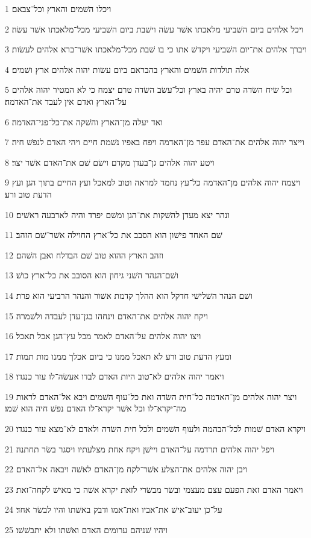 \par 1 ויכלו השׁמים והארץ וכל־צבאם׃
\par 2 ויכל אלהים ביום השׁביעי מלאכתו אשׁר עשׂה וישׁבת ביום השׁביעי מכל־מלאכתו אשׁר עשׂה׃
\par 3 ויברך אלהים את־יום השׁביעי ויקדשׁ אתו כי בו שׁבת מכל־מלאכתו אשׁר־ברא אלהים לעשׂות׃
\par 4 אלה תולדות השׁמים והארץ בהבראם ביום עשׂות יהוה אלהים ארץ ושׁמים׃
\par 5 וכל שׂיח השׂדה טרם יהיה בארץ וכל־עשׂב השׂדה טרם יצמח כי לא המטיר יהוה אלהים על־הארץ ואדם אין לעבד את־האדמה׃
\par 6 ואד יעלה מן־הארץ והשׁקה את־כל־פני־האדמה׃
\par 7 וייצר יהוה אלהים את־האדם עפר מן־האדמה ויפח באפיו נשׁמת חיים ויהי האדם לנפשׁ חיה׃
\par 8 ויטע יהוה אלהים גן־בעדן מקדם וישׂם שׁם את־האדם אשׁר יצר׃
\par 9 ויצמח יהוה אלהים מן־האדמה כל־עץ נחמד למראה וטוב למאכל ועץ החיים בתוך הגן ועץ הדעת טוב ורע׃
\par 10 ונהר יצא מעדן להשׁקות את־הגן ומשׁם יפרד והיה לארבעה ראשׁים׃
\par 11 שׁם האחד פישׁון הוא הסבב את כל־ארץ החוילה אשׁר־שׁם הזהב׃
\par 12 וזהב הארץ ההוא טוב שׁם הבדלח ואבן השׁהם׃
\par 13 ושׁם־הנהר השׁני גיחון הוא הסובב את כל־ארץ כושׁ׃
\par 14 ושׁם הנהר השׁלישׁי חדקל הוא ההלך קדמת אשׁור והנהר הרביעי הוא פרת׃
\par 15 ויקח יהוה אלהים את־האדם וינחהו בגן־עדן לעבדה ולשׁמרה׃
\par 16 ויצו יהוה אלהים על־האדם לאמר מכל עץ־הגן אכל תאכל׃
\par 17 ומעץ הדעת טוב ורע לא תאכל ממנו כי ביום אכלך ממנו מות תמות׃
\par 18 ויאמר יהוה אלהים לא־טוב היות האדם לבדו אעשׂה־לו עזר כנגדו׃
\par 19 ויצר יהוה אלהים מן־האדמה כל־חית השׂדה ואת כל־עוף השׁמים ויבא אל־האדם לראות מה־יקרא־לו וכל אשׁר יקרא־לו האדם נפשׁ חיה הוא שׁמו׃
\par 20 ויקרא האדם שׁמות לכל־הבהמה ולעוף השׁמים ולכל חית השׂדה ולאדם לא־מצא עזר כנגדו׃
\par 21 ויפל יהוה אלהים תרדמה על־האדם ויישׁן ויקח אחת מצלעתיו ויסגר בשׂר תחתנה׃
\par 22 ויבן יהוה אלהים את־הצלע אשׁר־לקח מן־האדם לאשׁה ויבאה אל־האדם׃
\par 23 ויאמר האדם זאת הפעם עצם מעצמי ובשׂר מבשׂרי לזאת יקרא אשׁה כי מאישׁ לקחה־זאת׃
\par 24 על־כן יעזב־אישׁ את־אביו ואת־אמו ודבק באשׁתו והיו לבשׂר אחד׃
\par 25 ויהיו שׁניהם ערומים האדם ואשׁתו ולא יתבשׁשׁו׃

